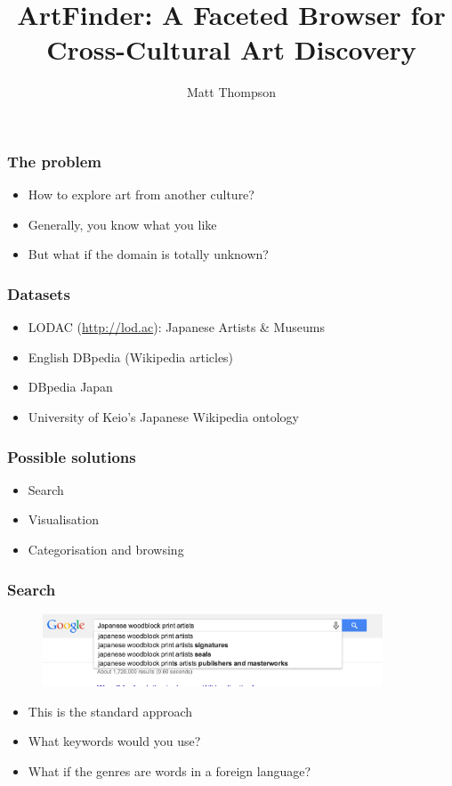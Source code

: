 \documentclass{beamer}
\title{ArtFinder: A Faceted Browser for Cross-Cultural Art Discovery}
\author{Matt Thompson}
\institute{University of Bath, NII Tokyo, Sysemia Ltd Bristol}
\date{}
\begin{document}
\frame{\titlepage}

\begin{frame}
    \frametitle{The problem}
        \begin{itemize}
            \item How to explore art from another culture?
            \item Generally, you know what you like
            \item But what if the domain is totally unknown?
        \end{itemize}
\end{frame}


\begin{frame}
    \frametitle{Datasets}
        \begin{itemize}
            \item LODAC (\url{http://lod.ac}): Japanese Artists \& Museums
            \item English DBpedia (Wikipedia articles)
            \item DBpedia Japan
            \item University of Keio's Japanese Wikipedia ontology
        \end{itemize}
\end{frame}


\begin{frame}
    \frametitle{Possible solutions}
        \begin{itemize}
            \item Search
            \item Visualisation
            \item Categorisation and browsing
        \end{itemize}
\end{frame}

\begin{frame}
    \frametitle{Search}
    \begin{figure}
        \centering
        \includegraphics[width=0.9\textwidth]{search.png}
    \end{figure}
        \begin{itemize}
            \item This is the standard approach
            \item What keywords would you use?
            \item What if the genres are words in a foreign language?
        \end{itemize}
\end{frame}
\end{document}
